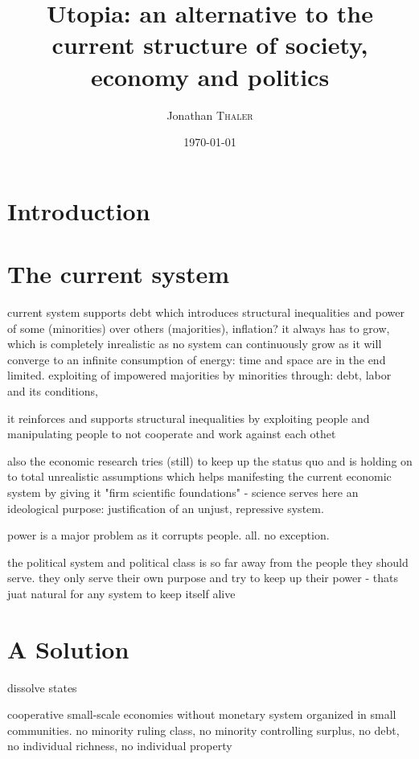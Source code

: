 \documentclass{article}
\title{Utopia: an alternative to the current structure of society, economy and politics} %
\author{Jonathan \textsc{Thaler}} %
\date{\today} %
\begin{document}
\maketitle %

\begin{abstract}

\end{abstract}

\section{Introduction}


\section{The current system}

current system supports debt which introduces structural inequalities and power of some (minorities) over others (majorities), inflation? it always has to grow, which is completely inrealistic as no system can continuously grow as it will converge to an infinite consumption of energy: time and space are in the end limited. exploiting of impowered majorities by minorities through: debt, labor and its conditions, 

it reinforces and supports structural inequalities by exploiting people and manipulating people to not cooperate and work against each othet

also the economic research tries (still) to keep up the status quo and is holding on to total unrealistic assumptions which helps manifesting the current economic system by giving it "firm scientific foundations" - science serves here an ideological purpose: justification of an unjust, repressive system.

power is a major problem as it corrupts people. all. no exception.

the political system and political class is so far away from the people they should serve. they only serve their own purpose and try to keep up their power - thats juat natural for any system to keep itself alive

\section{A Solution}
dissolve states

cooperative small-scale economies without monetary system organized in small communities. no minority ruling class, no minority controlling surplus, no debt, no individual richness, no individual property
\end{document}
